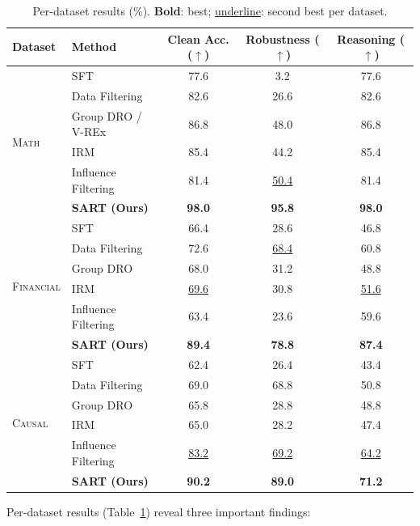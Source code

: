 \begin{table}[t]
\centering
\caption{Per-dataset results (\%). \textbf{Bold}: best; \underline{underline}: second best per dataset.}
\label{tab:per_dataset}
\small
\begin{tabular}{llccc}
\toprule
\textbf{Dataset} & \textbf{Method} & \textbf{Clean Acc.} ($\uparrow$) & \textbf{Robustness} ($\uparrow$) & \textbf{Reasoning} ($\uparrow$) \\
\midrule
\multirow{6}{*}{\textsc{Math}}
    & SFT                  & 77.6 &   3.2 & 77.6 \\
    & Data Filtering       & 82.6 &  26.6 & 82.6 \\
    & Group DRO / V-REx    & 86.8 &  48.0 & 86.8 \\
    & IRM                  & 85.4 &  44.2 & 85.4 \\
    & Influence Filtering  & 81.4 & \underline{50.4} & 81.4 \\
    & \textbf{SART (Ours)} & \textbf{98.0} & \textbf{95.8} & \textbf{98.0} \\
\midrule
\multirow{6}{*}{\textsc{Financial}}
    & SFT                  & 66.4 &  28.6 & 46.8 \\
    & Data Filtering       & 72.6 & \underline{68.4} & 60.8 \\
    & Group DRO            & 68.0 &  31.2 & 48.8 \\
    & IRM                  & \underline{69.6} &  30.8 & \underline{51.6} \\
    & Influence Filtering  & 63.4 &  23.6 & 59.6 \\
    & \textbf{SART (Ours)} & \textbf{89.4} & \textbf{78.8} & \textbf{87.4} \\
\midrule
\multirow{6}{*}{\textsc{Causal}}
    & SFT                  & 62.4 &  26.4 & 43.4 \\
    & Data Filtering       & 69.0 &  68.8 & 50.8 \\
    & Group DRO            & 65.8 &  28.8 & 48.8 \\
    & IRM                  & 65.0 &  28.2 & 47.4 \\
    & Influence Filtering  & \underline{83.2} & \underline{69.2} & \underline{64.2} \\
    & \textbf{SART (Ours)} & \textbf{90.2} & \textbf{89.0} & \textbf{71.2} \\
\bottomrule
\end{tabular}
\end{table}

Per-dataset results (Table~\ref{tab:per_dataset}) reveal three important findings:


